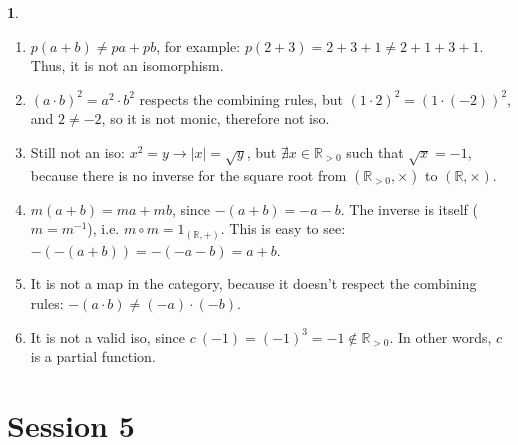 \documentclass{article}
\theoremstyle{definition}
\newcommand{\bb}[1]{\mathbb{#1}}
\newcommand{\R}{\bb{R}}
\newcommand{\abs}[1]{\left|#1\right|}
\theoremstyle{definition}
\theoremstyle{definition}
\newtheorem{solution-internal}{}[subsection]
\newenvironment{solution}{
  \begin{solution-internal}
}{
  \end{solution-internal}
}
\begin{document}
\begin{solution}
$ $ 
  \begin{enumerate}[label=\alph*.]
    \item $p(a+b) \neq p a + p b$, for example: $p(2+3) = 2 + 3 + 1 \neq 2 + 1 +
      3 + 1$. Thus, it is not an isomorphism.
    \item ${(a \cdot b)}^2 = a^2 \cdot b^2$ respects the combining rules, but
      ${(1 \cdot 2)}^2 = {(1 \cdot (-2))}^2$, and $2 \neq -2$, so it is not
      monic, therefore not iso.
    \item Still not an iso: $x^2 = y \rightarrow \abs{x} = \sqrt{y}$, but
      $\nexists x \in \R_{>0}$ such that $\sqrt{x} = -1$, because there is no
      inverse for the square root from $(\R_{>0}, \times)$ to $(\R, \times)$.
    \item $m(a+b) = ma + mb$, since $-(a+b) = -a -b$. The inverse is itself ($m
      = m^{-1}$), i.e. $m \circ m = 1_{(\R, +)}$. This is easy to see:
      $-(-(a+b)) = -(-a -b) = a + b$.
    \item It is not a map in the category, because it doesn't respect the
      combining rules: $-(a \cdot b) \neq (-a) \cdot (-b)$.
    \item It is not a valid iso, since $c~(-1) = (-1)^3 = -1 \notin \R_{>0}$. In
      other words, $c$ is a partial function.
  \end{enumerate}

\end{solution}

\section*{Session 5}
\setcounter{subsection}{5}
\setcounter{solution-internal}{0}
\end{document}
